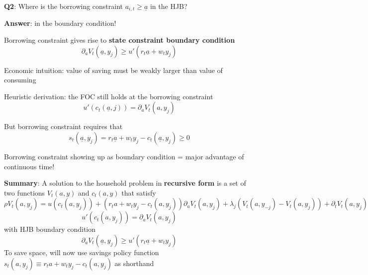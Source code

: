 \documentclass[11pt, aspectratio=169]{beamer}
\newenvironment{witemize}{\itemize\addtolength{\itemsep}{10pt}}{\enditemize}
\begin{document}
\begin{frame}{}

\vspace{6mm}
\textbf{Q2}: Where is the borrowing constraint $a_{i, t} \geq \underline a$ in the HJB?

\vspace{2mm}
\textbf{Answer}: in the boundary condition!


\vspace{4mm}
\begin{witemize}
\item Borrowing constraint gives rise to \textbf{state constraint boundary condition} 
\begin{equation*}
	\partial_a V_t(\underline a, y_j) \geq u'(r_t \underline a + w_t y_j) 
\end{equation*}

\item Economic intuition: value of saving must be weakly larger than value of consuming

\item Heuristic derivation: the FOC still holds at the borrowing constraint
\begin{equation*}
	u'(c_t(\underline a, j)) = \partial_a V_t(a, y_j) 
\end{equation*}

\item But borrowing constraint requires that 
\begin{equation*}
	s_t(\underline a, y_j) = r_t \underline a + w_t y_j - c_t(\underline a, y_j) \geq 0
\end{equation*}

\item Borrowing constraint showing up as boundary condition = major advantage of continuous time!

\end{witemize}

\end{frame}



\begin{frame}{}

\textbf{Summary}: A solution to the household problem in \textbf{recursive form} is a set of two functions $V_t(a, y)$ and $c_t(a, y)$ that satisfy
\begin{equation*}
	\rho V_t(a, y_j) = u(c_t(a, y_j)) + (r_t a + w_t y_j - c_t(a, y_j)) \partial_a V_t(a, y_j) + \lambda_j(V_t(a, y_{-j}) - V_t(a, y_j)) + \partial_t V_t(a, y_j)
\end{equation*}
\begin{equation*}
	u'(c_t(a, y_j)) = \partial_a V_t(a, y_j)
\end{equation*}
with HJB boundary condition 
\begin{equation*}
	\partial_a V_t(\underline a, y_j) \geq u'(r_t \underline a + w_t y_j) 
\end{equation*}
To save space, will now use savings policy function $s_t(a, y_j) \equiv r_t a + w_t y_j - c_t(a, y_j)$ as shorthand

\end{frame}
\end{document}
